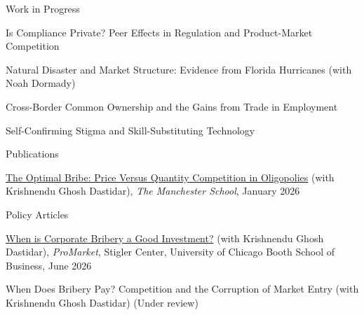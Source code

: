 \documentclass{resume} %
\begin{document}
\begin{rSection}{Work in Progress}
\vspace{-1em}
\item Is Compliance Private? Peer Effects in Regulation and Product-Market Competition
\item
Natural Disaster and Market Structure: Evidence from Florida Hurricanes (with Noah Dormady)
\item Cross-Border Common Ownership and the Gains from Trade in Employment
\item Self-Confirming Stigma and Skill-Substituting Technology
\end{rSection}

\begin{rSection}{Publications}
\vspace{-1em}
\item \href{https://doi.org/10.1111/manc.70022}{The Optimal Bribe: Price Versus Quantity Competition in Oligopolies} (with Krishnendu Ghosh Dastidar), \textit{The Manchester School}, January 2026
\end{rSection}

\begin{rSection}{Policy Articles}
\vspace{-1em}
\item \href{https://www.promarket.org/2026/06/30/when-is-corporate-bribery-a-good-investment/}{When is Corporate Bribery a Good Investment?} (with Krishnendu Ghosh Dastidar), \textit{ProMarket}, Stigler Center, University of Chicago Booth School of Business, June 2026

\item When Does Bribery Pay? Competition and the Corruption of Market Entry (with Krishnendu Ghosh Dastidar) (Under review)
\end{rSection}
\end{document}
